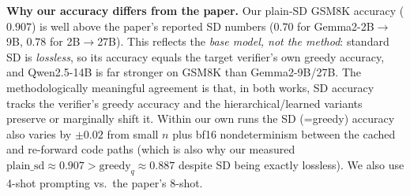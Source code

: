 \documentclass[11pt]{article}
\begin{document}
\textbf{Why our accuracy differs from the paper.} Our plain-SD GSM8K accuracy ($0.907$) is well
above the paper's reported SD numbers ($0.70$ for Gemma2-2B$\to$9B, $0.78$ for 2B$\to$27B). This
reflects the \emph{base model, not the method}: standard SD is \emph{lossless}, so its accuracy
equals the target verifier's own greedy accuracy, and Qwen2.5-14B is far stronger on GSM8K than
Gemma2-9B/27B. The methodologically meaningful agreement is that, in both works, SD accuracy tracks
the verifier's greedy accuracy and the hierarchical/learned variants preserve or marginally shift it.
Within our own runs the SD (=greedy) accuracy also varies by $\pm0.02$ from small $n$ plus bf16
nondeterminism between the cached and re-forward code paths (which is also why our measured
$\text{plain\_sd}\approx0.907 > \text{greedy}_q\approx0.887$ despite SD being exactly lossless).
We also use 4-shot prompting vs.\ the paper's 8-shot.
\end{document}
